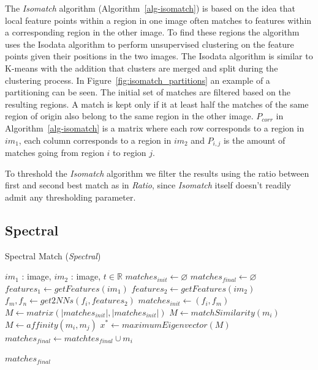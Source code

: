 The \emph{Isomatch} algorithm (Algorithm~\ref{alg-isomatch}) 
\cite{das2008event} is based on the idea that local feature points 
within a region in one image often matches to features within a 
corresponding region in the other image. To find these regions the 
algorithm uses the Isodata algorithm \cite{ball1965isodata} to perform 
unsupervised clustering on the feature points given their positions in 
the two images. The Isodata algorithm is similar to K-means with the 
addition that clusters are merged and split during the clustering 
process. In Figure~\ref{fig:isomatch_partitions} an example of a 
partitioning can be seen. The initial set of matches are filtered based 
on the resulting regions. A match is kept only if it at least half the 
matches of the same region of origin also belong to the same region in 
the other image.  $P_{corr}$ in Algorithm~\ref{alg-isomatch} is a matrix 
where each row corresponds to a region in $im_1$, each column 
corresponds to a region in $im_2$ and $P_{i,j}$ is the amount of matches 
going from region $i$ to region $j$.

To threshold the \emph{Isomatch} algorithm we filter the results using 
the ratio between first and second best match as in \emph{Ratio}, since 
\emph{Isomatch} itself doesn't readily admit any thresholding parameter.  

\subsection{Spectral}

\begin{algorithm}[h]
\caption{Spectral Match (\emph{Spectral})}
\label{alg-spectral}
\begin{algorithmic}
\Require $im_1$ : image, $im_2$ : image, $t \in \mathbb{R}$
\State $matches_{init}\gets \varnothing$
\State $matches_{final} \gets \varnothing$
\State $features_1 \gets getFeatures(im_1)$
\State $features_2 \gets getFeatures(im_2)$
	\State $f_m,f_n \gets get2NNs(f_i, features_2)$
	\State $matches_{init} \gets \left(f_i, f_m\right)$
\EndFor
\State $M \gets matrix(\left\vert matches_{init} \right\vert, \left\vert 
matches_{init} \right\vert)$
			\State $M \gets matchSimilarity(m_i)$
		\Else
			\State $M \gets affinity(m_i, m_j)$
		\EndIf
	\EndFor
\EndFor
\State $x^{*} \gets maximumEigenvector(M)$
		\State $matches_{final} \gets matchtes_{final} \cup m_i$
	\EndIf
\EndFor

\Return $matches_{final}$
\end{algorithmic}
\end{algorithm}

